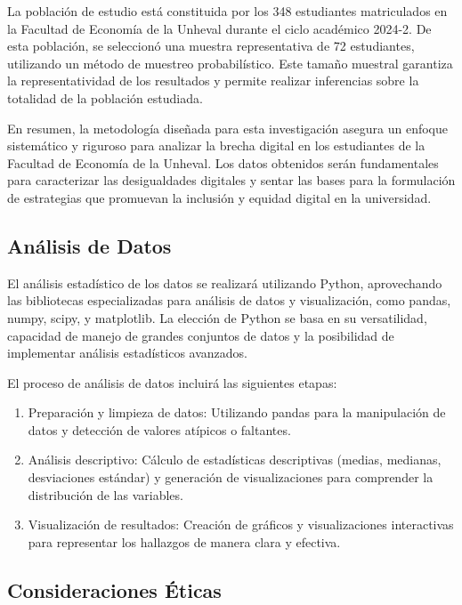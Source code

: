 \documentclass[12pt, a4paper]{article}
\begin{document}
La población de estudio está constituida por los 348 estudiantes matriculados en la Facultad de Economía de la Unheval durante el ciclo académico 2024-2. De esta población, se seleccionó una muestra representativa de 72 estudiantes, utilizando un método de muestreo probabilístico. Este tamaño muestral garantiza la representatividad de los resultados y permite realizar inferencias sobre la totalidad de la población estudiada.  

En resumen, la metodología diseñada para esta investigación asegura un enfoque sistemático y riguroso para analizar la brecha digital en los estudiantes de la Facultad de Economía de la Unheval. Los datos obtenidos serán fundamentales para caracterizar las desigualdades digitales y sentar las bases para la formulación de estrategias que promuevan la inclusión y equidad digital en la universidad.


\subsection{Análisis de Datos}

El análisis estadístico de los datos se realizará utilizando Python, aprovechando las bibliotecas especializadas para análisis de datos y visualización, como pandas, numpy, scipy, y matplotlib. La elección de Python se basa en su versatilidad, capacidad de manejo de grandes conjuntos de datos y la posibilidad de implementar análisis estadísticos avanzados.

El proceso de análisis de datos incluirá las siguientes etapas:

\begin{enumerate}
    \item Preparación y limpieza de datos: Utilizando pandas para la manipulación de datos y detección de valores atípicos o faltantes.
    \item Análisis descriptivo: Cálculo de estadísticas descriptivas (medias, medianas, desviaciones estándar) y generación de visualizaciones para comprender la distribución de las variables.
    \item Visualización de resultados: Creación de gráficos y visualizaciones interactivas para representar los hallazgos de manera clara y efectiva.
\end{enumerate}

\subsection{Consideraciones Éticas}
\end{document}
